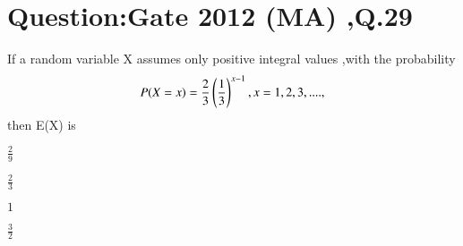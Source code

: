 \documentclass[journal,12pt,twocolumn]{IEEEtran}
\begin{document}
\section*{Question:Gate 2012 (MA) ,Q.29}
If a random variable X assumes only positive integral values ,with the probability
$$P(X=x)=\frac{2}{3}\left(\frac{1}{3}\right)^{x-1},x=1,2,3,....,$$
then E(X) is 
\begin{enumerate}[(A)]
\begin{multicols}{2}
\item $ \frac{2}{9}$\\
\item $\frac{2}{3}$\\
\item $ 1$\\
\item $\frac{3}{2}$
\end{multicols}
\end{enumerate}
\end{document}
